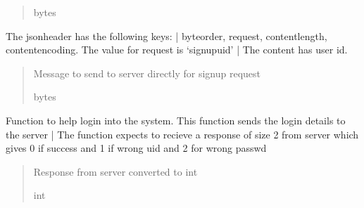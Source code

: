 \documentclass[letterpaper,10pt,english]{sphinxmanual}
\begin{document}
\begin{fulllineitems}
\begin{fulllineitems}
\begin{quote}
\begin{description}
\sphinxAtStartPar
bytes

\end{description}\end{quote}

\end{fulllineitems}


\begin{fulllineitems}
\label{\detokenize{Message:Message.Message._create_signupuid_request}}
\pysigstartsignatures
{}
\pysigstopsignatures
\sphinxAtStartPar
The jsonheader has the following keys: |
byteorder, request, content\sphinxhyphen{}length, content\sphinxhyphen{}encoding. The value for request is ‘signupuid’ |
The content has user id.
\begin{quote}\begin{description}
\sphinxAtStartPar
Message to send to server directly for signup request

\sphinxAtStartPar
bytes

\end{description}\end{quote}

\end{fulllineitems}


\begin{fulllineitems}
\label{\detokenize{Message:Message.Message._login}}
\pysigstartsignatures
{}
\pysigstopsignatures
\sphinxAtStartPar
Function to help login into the system. This function sends the login details to the server |
The function expects to recieve a response of size 2 from server which gives 0 if success and 1 if wrong uid and 2 for wrong passwd
\begin{quote}\begin{description}
\sphinxAtStartPar
Response from server converted to int

\sphinxAtStartPar
int

\end{description}\end{quote}


\end{fulllineitems}
\end{fulllineitems}
\end{document}

